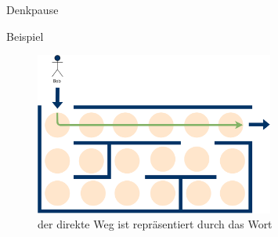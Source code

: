 {
\begin{frame}{Denkpause}
    \begin{alertblock}{Beispiel}
        \begin{figure}
            \centering
            \includegraphics[width=0.7\textwidth]{../figures/GBeispiel1.png}
            \caption{der direkte Weg ist repräsentiert durch das Wort \alert{\MoveDown\Forward\Forward\Forward\Forward\Forward\Forward}}
        \end{figure}
    \end{alertblock}
\end{frame}
}

